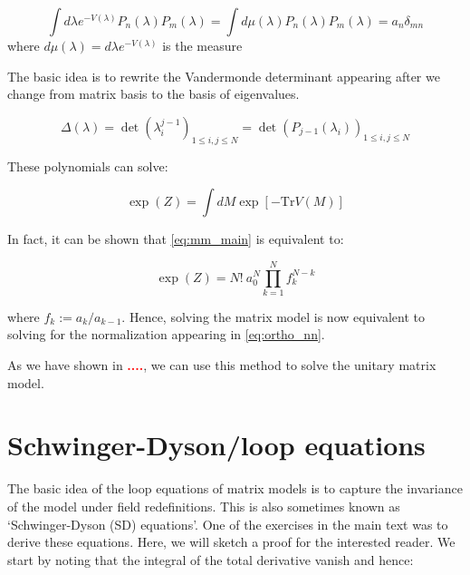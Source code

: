 \documentclass[11pt]{article}
\newcommand{\TODO}[1]{\textcolor{red}{{\bf #1}}}
\begin{document}
\begin{equation}
	\label{eq:ortho_nn} 
	\int d\lambda e^{-V(\lambda)} P_{n}(\lambda)
	P_{m}(\lambda) = \int d \mu(\lambda) P_{n}(\lambda)
	P_{m}(\lambda) = a_{n} \delta_{mn} 
\end{equation}
where $d \mu(\lambda) = d\lambda e^{-V(\lambda)}$ is the measure  

The basic idea is to rewrite the Vandermonde determinant appearing after we change from matrix basis to the basis of eigenvalues. 

\begin{equation}
	\Delta(\lambda) = \det(\lambda_{i}^{j-1})_{1 \le i, j \le N} = \det(P_{j-1}(\lambda_i))_{1 \le i, j \le N}
\end{equation}


These polynomials can solve:

\begin{equation}
	\label{eq:mm_main}
	\exp(Z) = \int dM \exp[-\mbox{Tr} V(M)] 
\end{equation}

In fact, it can be shown that \ref{eq:mm_main} is equivalent to:

\begin{equation}
	\exp(Z) = N! ~ a_{0}^{N} \prod_{k=1}^{N} f_{k}^{N-k}
\end{equation}

where $f_{k} := a_{k}/a_{k-1}$. Hence, solving the matrix model is now equivalent to solving for the normalization appearing in \ref{eq:ortho_nn}. 

As we have shown in \TODO{....}, we can use this method to solve the unitary matrix model.


\section{Schwinger-Dyson/loop equations}
The basic idea of the loop equations of matrix models is to capture the invariance of the model under field redefinitions. This is also sometimes known as `Schwinger-Dyson (SD) equations'. One of the exercises in the main text was to derive these equations. Here, we will sketch a proof for the interested reader. We start by noting that the integral of the total derivative vanish and hence:
\end{document}
